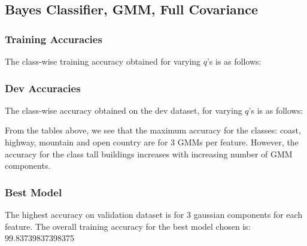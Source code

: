 \documentclass[11pt,a4paper]{article}
\newcommand{\noi}{\noindent}
\begin{document}
\subsection{Bayes Classifier, GMM, Full Covariance}
\subsubsection{Training Accuracies}
The class-wise training accuracy obtained for varying $q$'s is as follows:


\subsubsection{Dev Accuracies}
The class-wise accuracy obtained on the dev dataset, for varying $q$'s is as follows:


\noi
From the tables above, we see that the maximum accuracy for the classes: coast, highway, mountain and open country are for 3 GMMs per feature. However, the accuracy for the class tall buildings increases with increasing number of GMM components.

\subsubsection{Best Model}
The highest accuracy on validation dataset is for 3 gaussian components for each feature. The overall training accuracy for the best model chosen is: 99.83739837398375\\
\end{document}
